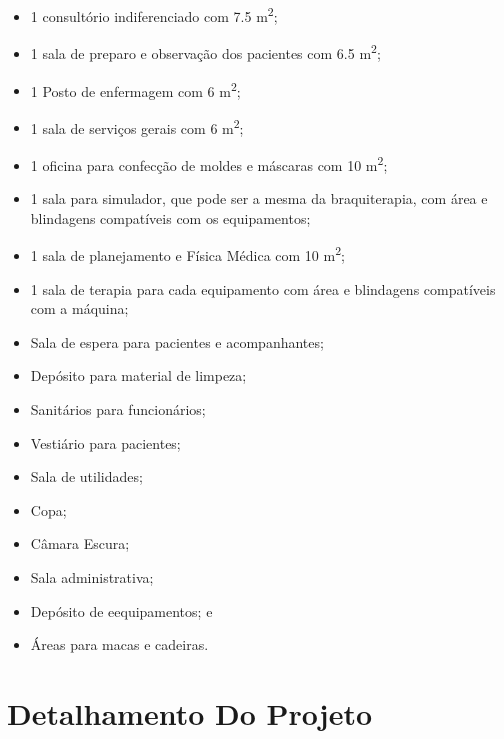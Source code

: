 \documentclass[11pt,a4paper]{article}
\begin{document}
            \begin{itemize}
                \item 1 consultório indiferenciado com 7.5 m\textsuperscript{2};
                \item 1 sala de preparo e observação dos pacientes com 6.5 m\textsuperscript{2};
                \item 1 Posto de enfermagem com 6 m\textsuperscript{2};
                \item 1 sala de serviços gerais com 6 m\textsuperscript{2};
                \item 1 oficina para confecção de moldes e máscaras com 10 m\textsuperscript{2};
                \item 1 sala para simulador, que pode ser a mesma da braquiterapia, com área e blindagens compatíveis com os equipamentos;
                \item 1 sala de planejamento e Física Médica com 10 m\textsuperscript{2};
                \item 1 sala de terapia para cada equipamento com área e blindagens compatíveis com a máquina;
                \item Sala de espera para pacientes e acompanhantes;
                \item Depósito para material de limpeza;
                \item Sanitários para funcionários;
                \item Vestiário para pacientes;
                \item Sala de utilidades;
                \item Copa;
                \item Câmara Escura;
                \item Sala administrativa;
                \item Depósito de eequipamentos; e 
                \item Áreas para macas e cadeiras.
            \end{itemize}

    \section{Detalhamento Do Projeto}
        
\end{document}
